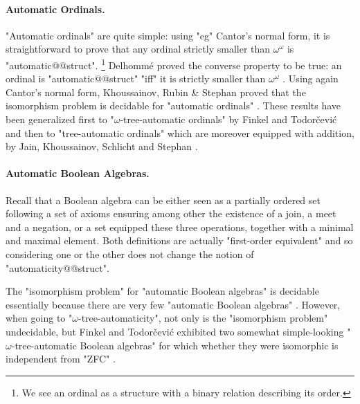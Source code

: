 \paragraph*{Automatic Ordinals.}
"Automatic ordinals" are quite simple: using "eg" Cantor's normal form, it is straightforward
to prove that any ordinal strictly smaller than $\omega^\omega$ is "automatic@@struct".%
\footnote{We see an ordinal as a structure with a binary relation describing its order.}
Delhommé proved the converse property to be true:
an ordinal is "automatic@@struct" "iff" it is strictly smaller than $\omega^\omega$
\cite[Corollaire~2.2]{Delhommé2004AutomaticitéOrdinaux}.
Using again Cantor's normal form,
Khoussainov, Rubin \& Stephan proved that the isomorphism problem is decidable for
"automatic ordinals" \cite[Theorem~5.3]{KhoussainovRubinStephan2005AutomaticLinearOrders}.
These results have been generalized first to "$\omega$-tree-automatic ordinals"
by Finkel and Todor\v{c}ević \cite{FinkelTodorcevic2013AutomaticOrdinals}
and then to "tree-automatic ordinals" which
are moreover equipped with addition, by Jain, Khoussainov, Schlicht and Stephan
\cite{JainKhoussainovSchlichtStephan2019IsomorphismTreeAutomaticOrdinals}.

\paragraph*{Automatic Boolean Algebras.}
Recall that a Boolean algebra can be either seen as a partially ordered set
following a set of axioms ensuring among other the existence of a join, a meet
and a negation, or a set equipped these three operations, together with a minimal and maximal 
element. Both definitions are actually "first-order equivalent" and so considering one
or the other does not change the notion of "automaticity@@struct".

The "isomorphism problem" for "automatic Boolean algebras" is decidable
\cite[Corollary~3.5]{KhoussainovNiesRubinStephan2007Automatic} essentially
because there are very few "automatic Boolean algebras" \cite[Theorem~3.4]{KhoussainovNiesRubinStephan2007Automatic}.
However, when going to "$\omega$-tree-automaticity", not only is the "isomorphism problem"
undecidable, but Finkel and Todor\v{c}ević exhibited two somewhat simple-looking
"$\omega$-tree-automatic Boolean algebras" for which whether they were isomorphic
is independent from "ZFC" \cite[Theorem~6.1]{FinkelTodorcevic2010Isomorphism}.

